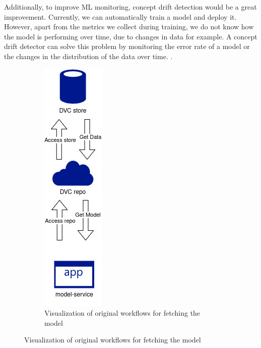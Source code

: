 Additionally, to improve ML monitoring, concept drift detection would be a great improvement. Currently, we can automatically train a model and deploy it. However, apart from the metrics we collect during training, we do not know how the model is performing over time, due to changes in data for example. A concept drift detector can solve this problem by monitoring the error rate of a model or the changes in the distribution of the data over time.  
. 

\begin{figure}[h]
    \centering
    \begin{subfigure}[b]{0.45\linewidth}
        \centering
        \includegraphics[width=0.35\linewidth]{images/original_fetch.jpg}
        \caption{Visualization of original workflows for fetching the model}
        \label{fig:libversion-workflow1}
    \end{subfigure}

\end{figure}
